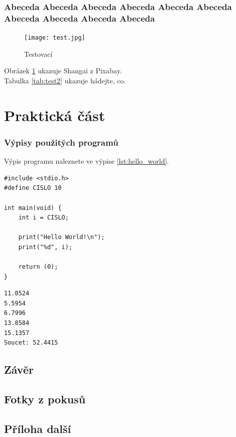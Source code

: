 \documentclass[12pt]{report}			%
\begin{document}
				\lipsum[2]

			\section[X-krát Abeceda]{Abeceda Abeceda Abeceda Abeceda Abeceda Abeceda Abeceda Abeceda Abeceda Abeceda }
				\begin{figure}
				  \texttt{[image: test.jpg]}
				  \caption{Testovací}
				  \label{fig:test}
				\end{figure}
				Obrázek \ref{fig:test} ukazuje Shangai z Pixabay.\\
				Tabulka \ref{tab:test2} ukazuje hádejte, co.
		
	\lipsum[3]

	\part{Praktická část}

\section{Výpisy použitých programů}

\lipsum[1]	

Výpis programu   naleznete ve výpise \ref{lst:hello_world}.

\begin{lstlisting}[title={Program hello.c}, caption={hello.c}, label={lst:hello_world}]
#include <stdio.h>
#define CISLO 10

int main(void) {
	int i = CISLO;

	print("Hello World!\n");
	print("%d", i);

	return (0);
}
\end{lstlisting}

\lipsum[1]	

\begin{lstlisting}[numbers=none, title={Příklad výstupního souboru}]
11.0524
5.5954
6.7996
13.8584
15.1357
Soucet: 52.4415
\end{lstlisting}

	\chapter*{Závěr}
	
		\lipsum[1]
	
	\nocite{*}
    \printbibliography					%
    \printglossary[title={Zkratky}]		%
    \listoffigures						%
    \listoftables						%

    \begin{appendices}
	\chapter{Fotky z pokusů}	
	\lipsum[1]
	\chapter{Příloha další }
	\end{appendices}
\end{document}
